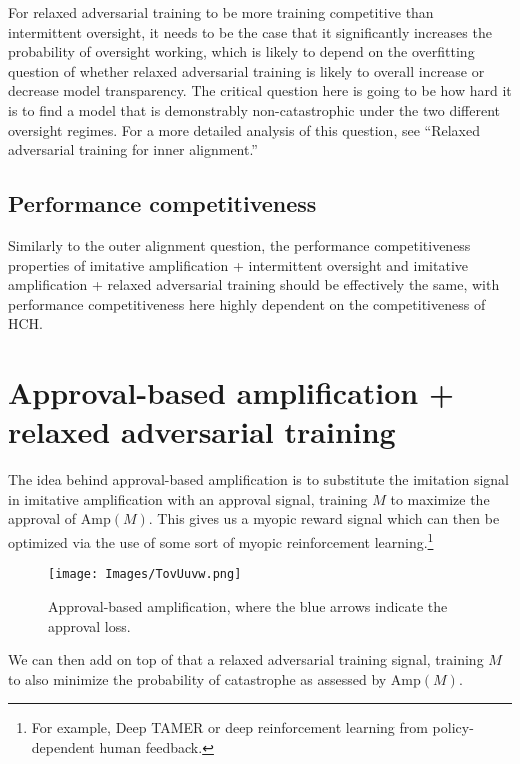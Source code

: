 \documentclass[
  onecolumn,
  natbib,
]{miri-tech-article}
\begin{document}
For relaxed adversarial training to be more training competitive than intermittent oversight, it needs to be the case that it significantly increases the probability of oversight working, which is likely to depend on the overfitting question of whether relaxed adversarial training is likely to overall increase or decrease model transparency. The critical question here is going to be how hard it is to find a model that is demonstrably non-catastrophic under the two different oversight regimes. For a more detailed analysis of this question, see ``Relaxed adversarial training for inner alignment.''\cite{relaxed}

\subsection{Performance competitiveness} Similarly to the outer alignment question, the performance competitiveness properties of imitative amplification + intermittent oversight and imitative amplification + relaxed adversarial training should be effectively the same, with performance competitiveness here highly dependent on the competitiveness of HCH.

\section{Approval-based amplification + relaxed adversarial training}
\label{sec:4}

The idea behind approval-based amplification is to substitute the imitation signal in imitative amplification with an approval signal, training $M$ to maximize the approval of $\text{Amp}(M)$. This gives us a myopic reward signal which can then be optimized via the use of some sort of myopic reinforcement learning.\footnote{For example, Deep TAMER\cite{deep_tamer} or deep reinforcement learning from policy-dependent human feedback\cite{deep_rl}.}

\newpage

\vspace{4mm}

\begin{figure}[h!]
  \centering
  \texttt{[image: Images/TovUuvw.png]}
  \caption{Approval-based amplification, where the blue arrows indicate the approval loss.}
\end{figure}

\vspace{2mm}

\noindent We can then add on top of that a relaxed adversarial training signal, training $M$ to also minimize the probability of catastrophe as assessed by $\text{Amp}(M)$.
\end{document}
